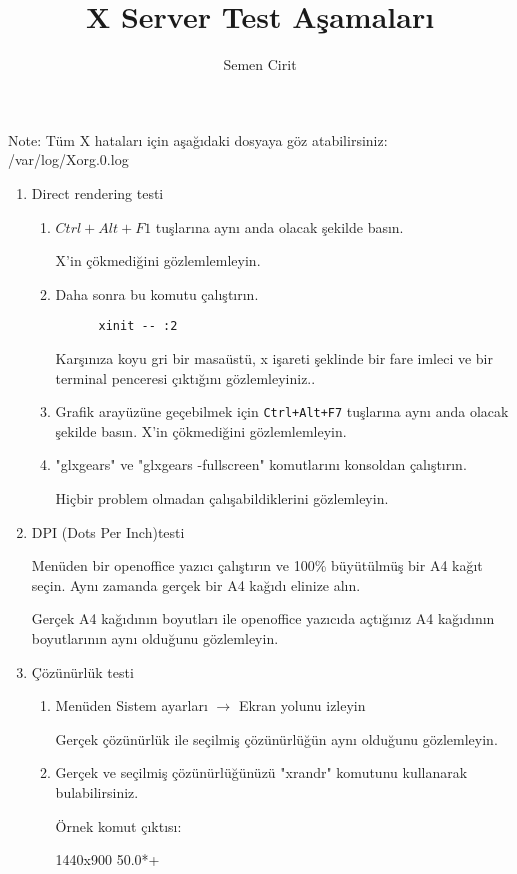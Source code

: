 \documentclass[a4paper,10pt]{article}
\title{X Server Test Aşamaları}
\author{Semen Cirit}
\begin{document}
\maketitle

 Note:	
  	Tüm X hataları için  aşağıdaki dosyaya göz atabilirsiniz:
	/var/log/Xorg.0.log  
\begin{enumerate}
  \item Direct rendering testi
    \begin{enumerate}
    \item   $Ctrl+Alt+F1$ tuşlarına aynı anda olacak şekilde basın.

	    X'in çökmediğini gözlemlemleyin.
    \item  Daha sonra bu komutu çalıştırın.
	  \begin{verbatim}
	  xinit -- :2
	  \end{verbatim}
	  Karşınıza koyu gri bir masaüstü, x işareti şeklinde bir fare imleci ve bir terminal penceresi çıktığını gözlemleyiniz..
    \item Grafik arayüzüne geçebilmek için \texttt{Ctrl+Alt+F7} tuşlarına aynı anda olacak şekilde basın.    
	   X'in çökmediğini gözlemlemleyin.
    \item "glxgears" ve "glxgears -fullscreen" komutlarını konsoldan çalıştırın.

	  Hiçbir problem olmadan çalışabildiklerini gözlemleyin.
    \end{enumerate}

  \item DPI (Dots Per Inch)testi
    
        Menüden bir openoffice yazıcı çalıştırın ve 100\% büyütülmüş bir A4 kağıt seçin. Aynı zamanda gerçek bir A4 kağıdı elinize alın.

        Gerçek A4 kağıdının boyutları ile openoffice yazıcıda açtığınız A4 kağıdının boyutlarının aynı olduğunu gözlemleyin.
  \item Çözünürlük testi
     \begin{enumerate}
      \item Menüden Sistem ayarları $\rightarrow$ Ekran yolunu izleyin

	Gerçek çözünürlük ile seçilmiş çözünürlüğün aynı olduğunu gözlemleyin.

      \item Gerçek ve seçilmiş çözünürlüğünüzü "xrandr" komutunu kullanarak bulabilirsiniz.
	  
	  Örnek komut çıktısı:
	  
	  1440x900  50.0*+
	  

\end{enumerate}
\end{enumerate}
\end{document}
